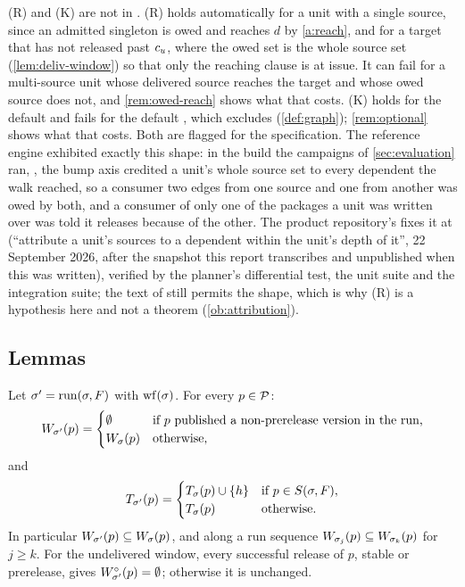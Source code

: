 (R) and (K) are not in \SPEC{}. (R) holds automatically for a unit with a
single source, since an admitted singleton is owed and reaches $d$ by
\cref{a:reach}, and for a target that has not released past $c_{u}$, where
the owed set is the whole source set (\cref{lem:deliv-window}) so that only
the reaching clause is at issue. It can fail for a multi-source unit whose
delivered source reaches the target and whose owed source does not, and
\cref{rem:owed-reach} shows what that costs. (K) holds for the default
\Korder{} and fails for the default \Kblock{}, which excludes
 (\cref{def:graph}); \cref{rem:optional} shows what
that costs. Both are flagged for the specification. The reference engine exhibited exactly this shape: in the build the campaigns of \cref{sec:evaluation} ran, , the bump axis credited a unit's whole source set to every dependent the walk reached, so a consumer two edges from one source and one from another was owed by both, and a consumer of only one of the packages a unit was written over was told it releases because of the other. The product repository's  fixes it at  (``attribute a unit's sources to a dependent within the unit's depth of it'', 22 September 2026, after the snapshot this report transcribes and unpublished when this was written), verified by the planner's differential test, the unit suite and the integration suite; the text of  still permits the shape, which is why (R) is a hypothesis here and not a theorem (\cref{ob:attribution}).

\subsection{Lemmas}

\begin{lemma}
\label{lem:window}
Let $\sigma' = \mathrm{run}(\sigma,F)$ with $\mathrm{wf}(\sigma)$. For every $p \in \mathcal{P}$:
\[
  W_{\sigma'}(p) =
  \begin{cases}
    \emptyset & \text{if $p$ published a non-prerelease version in the run,}\\
    W_{\sigma}(p) & \text{otherwise,}
  \end{cases}
\]
and
\[
  T_{\sigma'}(p) =
  \begin{cases}
    T_{\sigma}(p) \cup \{h\} & \text{if } p \in S(\sigma,F),\\
    T_{\sigma}(p) & \text{otherwise.}
  \end{cases}
\]
In particular $W_{\sigma'}(p) \subseteq W_{\sigma}(p)$, and along a run sequence
$W_{\sigma_j}(p) \subseteq W_{\sigma_k}(p)$ for $j \geq k$.
For the undelivered window, every successful release of $p$, stable or
prerelease, gives $W^{\circ}_{\sigma'}(p)=\emptyset$; otherwise it is unchanged.
\end{lemma}

